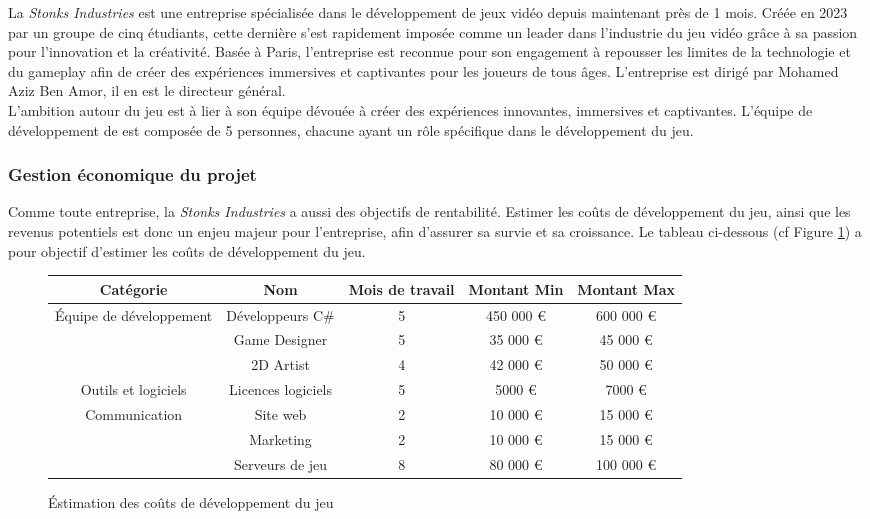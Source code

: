 La \textit{Stonks Industries} est une entreprise spécialisée dans le développement de jeux vidéo depuis maintenant pr\`es de 1 mois.
Créée en 2023 par un groupe de cinq \'etudiants, cette derni\`ere s'est rapidement impos\'ee comme un leader dans l'industrie du jeu vidéo gr\^ace \`a sa passion pour l'innovation et la cr\'eativité. 
Basée à Paris, l'entreprise est reconnue pour son engagement à repousser les limites de la technologie et du gameplay afin de créer des expériences immersives et captivantes pour les joueurs de tous âges.
L'entreprise est dirig\'e par Mohamed Aziz Ben Amor, il en est le directeur général. 
\\

L'ambition autour du jeu \textit{\gameName} est \`a lier \`a son \'equipe d\'evou\'ee \`a cr\'eer des exp\'eriences innovantes, immersives et captivantes. 
L'équipe de développement de \textit{\gameName} est composée de 5 personnes, chacune ayant un rôle spécifique dans le développement du jeu.
\\

\subsubsection*{Gestion \'economique du projet}

Comme toute entreprise, la \textit{Stonks Industries} a aussi des objectifs de rentabilité.
Estimer les co\^uts de développement du jeu, ainsi que les revenus potentiels est donc un enjeu majeur pour l'entreprise, afin d'assurer sa survie et sa croissance.
Le tableau ci-dessous (cf Figure \ref*{fig:couts_de_dev}) a pour objectif d'estimer les co\^uts de développement du jeu.
\\

\begin{figure}[H]
    \centering
    \begin{tabular}{|c|c|c|c|c|}
        \hline
        Cat\'egorie & Nom & Mois de travail & Montant Min & Montant Max \\
        \hline
        \multirow{3}{*}{\'Equipe de d\'eveloppement} & Développeurs C\# & 5 & 450 000 \euro  & 600 000 \euro \\
        \cline{2-5}
        & Game Designer & 5 & 35 000 \euro & 45 000 \euro \\
        \cline{2-5}
        & 2D Artist & 4 & 42 000 \euro & 50 000 \euro \\
        \hline
        Outils et logiciels & Licences logiciels & 5 & 5000 \euro & 7000 \euro \\
        \hline
        \multirow{2}{*}{Communication} & Site web & 2 & 10 000 \euro & 15 000 \euro \\
        \cline{2-5}
        & Marketing & 2 & 10 000 \euro & 15 000 \euro \\
        \hline
         & Serveurs de jeu & 8 & 80 000 \euro & 100 000 \euro \\




    \end{tabular}
    \caption{\'Estimation des co\^uts de développement du jeu}
    \label{fig:couts_de_dev}
\end{figure}





